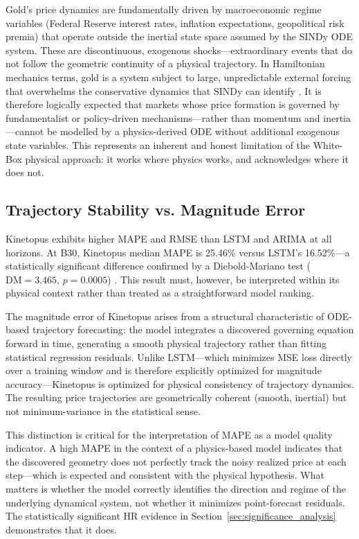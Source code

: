 \documentclass[11pt,a4paper]{article}
\begin{document}
Gold's price dynamics are fundamentally driven by macroeconomic regime variables (Federal Reserve interest rates, inflation expectations, geopolitical risk premia) that operate outside the inertial state space assumed by the SINDy ODE system. These are discontinuous, exogenous shocks---extraordinary events that do not follow the geometric continuity of a physical trajectory. In Hamiltonian mechanics terms, gold is a system subject to large, unpredictable external forcing that overwhelms the conservative dynamics that SINDy can identify \cite{raissi2019physics}. It is therefore logically expected that markets whose price formation is governed by fundamentalist or policy-driven mechanisms---rather than momentum and inertia---cannot be modelled by a physics-derived ODE without additional exogenous state variables. This represents an inherent and honest limitation of the White-Box physical approach: it works where physics works, and acknowledges where it does not.

\subsection{Trajectory Stability vs. Magnitude Error}
\label{sec:trajectory_vs_error}

Kinetopus exhibits higher MAPE and RMSE than LSTM and ARIMA at all horizons. At B30, Kinetopus median MAPE is 25.46\% versus LSTM's 16.52\%---a statistically significant difference confirmed by a Diebold-Mariano test ($\text{DM} = 3.465$, $p = 0.0005$) \cite{diebold1995comparing}. This result must, however, be interpreted within its physical context rather than treated as a straightforward model ranking.

The magnitude error of Kinetopus arises from a structural characteristic of ODE-based trajectory forecasting: the model integrates a discovered governing equation forward in time, generating a smooth physical trajectory rather than fitting statistical regression residuals. Unlike LSTM---which minimizes MSE loss directly over a training window and is therefore explicitly optimized for magnitude accuracy---Kinetopus is optimized for physical consistency of trajectory dynamics. The resulting price trajectories are geometrically coherent (smooth, inertial) but not minimum-variance in the statistical sense.

This distinction is critical for the interpretation of MAPE as a model quality indicator. A high MAPE in the context of a physics-based model indicates that the discovered geometry does not perfectly track the noisy realized price at each step---which is expected and consistent with the physical hypothesis. What matters is whether the model correctly identifies the direction and regime of the underlying dynamical system, not whether it minimizes point-forecast residuals. The statistically significant HR evidence in Section~\ref{sec:significance_analysis} demonstrates that it does.
\end{document}
